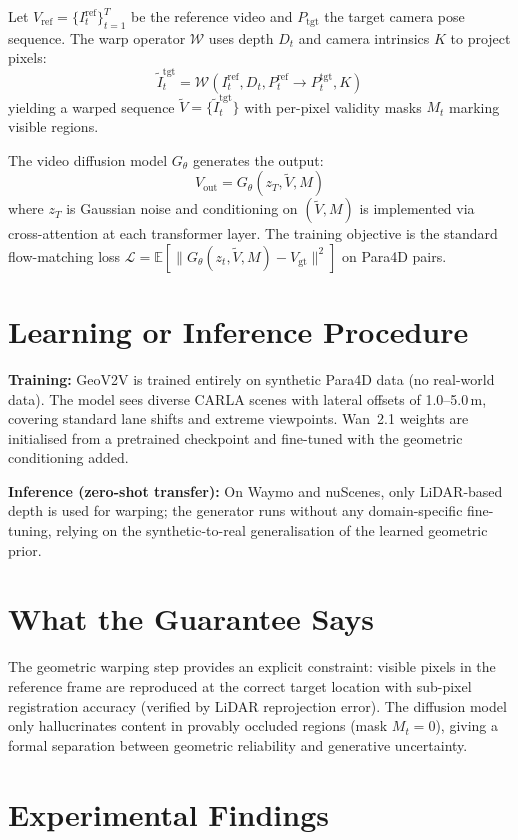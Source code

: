 \documentclass[10pt,twocolumn]{article}
\begin{document}
Let $V_\mathrm{ref} = \{I_t^{\mathrm{ref}}\}_{t=1}^T$ be the reference
video and $P_\mathrm{tgt}$ the target camera pose sequence. The warp
operator $\mathcal{W}$ uses depth $D_t$ and camera intrinsics $K$ to
project pixels:
\[
\tilde{I}_t^{\mathrm{tgt}} = \mathcal{W}(I_t^{\mathrm{ref}}, D_t,
  P_t^{\mathrm{ref}} \to P_t^{\mathrm{tgt}}, K)
\]
yielding a warped sequence $\tilde{V} = \{\tilde{I}_t^{\mathrm{tgt}}\}$
with per-pixel validity masks $M_t$ marking visible regions.

The video diffusion model $G_\theta$ generates the output:
\[
V_\mathrm{out} = G_\theta\!\left(z_T, \tilde{V}, M\right)
\]
where $z_T$ is Gaussian noise and conditioning on $(\tilde{V}, M)$
is implemented via cross-attention at each transformer layer.
The training objective is the standard flow-matching loss
$\mathcal{L} = \mathbb{E}[\|G_\theta(z_t, \tilde{V}, M) - V_\mathrm{gt}\|^2]$
on Para4D pairs.

\section{Learning or Inference Procedure}

\textbf{Training:} GeoV2V is trained entirely on synthetic Para4D data
(no real-world data). The model sees diverse CARLA scenes with
lateral offsets of 1.0--5.0\,m, covering standard lane shifts and
extreme viewpoints. Wan~2.1 weights are initialised from a pretrained
checkpoint and fine-tuned with the geometric conditioning added.

\textbf{Inference (zero-shot transfer):} On Waymo and nuScenes, only
LiDAR-based depth is used for warping; the generator runs without
any domain-specific fine-tuning, relying on the synthetic-to-real
generalisation of the learned geometric prior.

\section{What the Guarantee Says}

The geometric warping step provides an explicit constraint: visible
pixels in the reference frame are reproduced at the correct target
location with sub-pixel registration accuracy (verified by LiDAR
reprojection error). The diffusion model only hallucrinates content
in provably occluded regions (mask $M_t = 0$), giving a formal
separation between geometric reliability and generative uncertainty.

\section{Experimental Findings}
\end{document}
